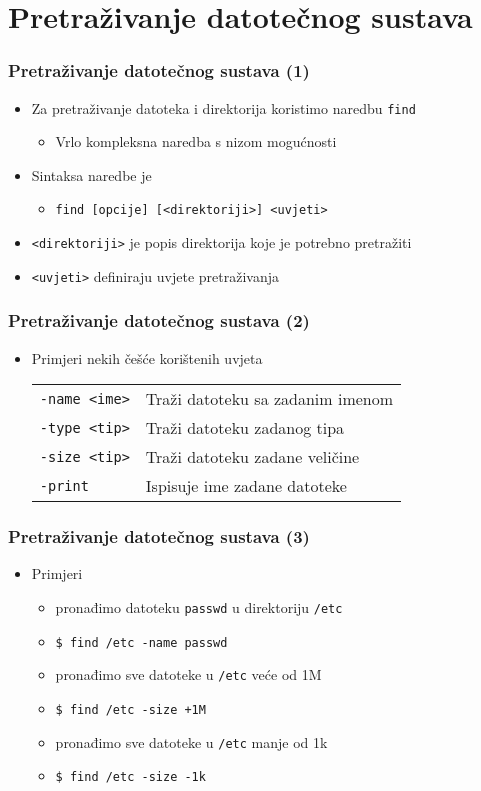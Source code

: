 \documentclass{beamer}
\newcommand{\shell}[1]{\texttt{#1}}
\begin{document}
\section{Pretraživanje datotečnog sustava}
\begin{frame}[t]
\frametitle{Pretraživanje datotečnog sustava (1)}
\begin{itemize}
  \item Za pretraživanje datoteka i direktorija koristimo naredbu 
        \shell{find}
  \begin{itemize}
    \item Vrlo kompleksna naredba s nizom mogućnosti
  \end{itemize}
  \item Sintaksa naredbe je
  \begin{itemize}
    \item[] \shell{find [opcije] [<direktoriji>] <uvjeti>}
  \end{itemize}
  \item \shell{<direktoriji>} je popis direktorija koje je potrebno 
        pretražiti
  \item \shell{<uvjeti>} definiraju uvjete pretraživanja
\end{itemize}
\end{frame}

\begin{frame}[t]
\frametitle{Pretraživanje datotečnog sustava (2)}
\begin{itemize}
  \item Primjeri nekih češće korištenih uvjeta
  \begin{tabular}{l l}
    \shell{-name <ime>} & Traži datoteku sa zadanim imenom  \\
    \shell{-type <tip>} & Traži datoteku zadanog tipa       \\
    \shell{-size <tip>} & Traži datoteku zadane veličine    \\
    \shell{-print}      & Ispisuje ime zadane datoteke
  \end{tabular}
\end{itemize}
\end{frame}

\begin{frame}[t]
\frametitle{Pretraživanje datotečnog sustava (3)}
\begin{itemize}
  \item Primjeri
  \begin{itemize}
    \item pronađimo datoteku \shell{passwd} u direktoriju \shell{/etc}
    \item[] \shell{\$ find /etc -name passwd}
    \item pronađimo sve datoteke u \shell{/etc} veće od 1M
    \item[] \shell{\$ find /etc -size +1M}
    \item pronađimo sve datoteke u \shell{/etc} manje od 1k
    \item[] \shell{\$ find /etc -size -1k}
  \end{itemize}
\end{itemize}
\end{frame}
\end{document}

